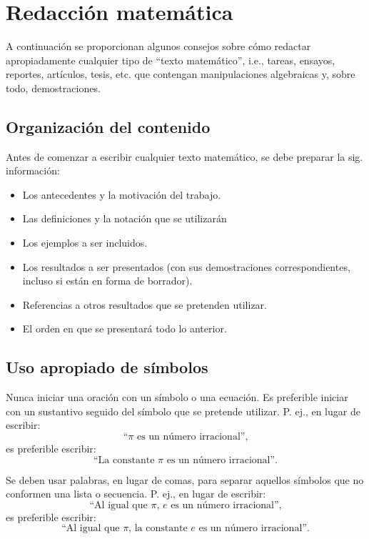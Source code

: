\chapter{Redacción matemática}

A continuación se proporcionan algunos consejos sobre cómo redactar apropiadamente cualquier tipo de ``texto matemático'', i.e., tareas, ensayos, reportes, artículos, tesis, etc. que contengan manipulaciones algebraicas y, sobre todo, demostraciones.


\section{Organización del contenido}

Antes de comenzar a escribir cualquier texto matemático, se debe preparar la sig. información:

\begin{itemize}
  \item Los antecedentes y la motivación del trabajo.
  \item Las definiciones y la notación que se utilizarán
  \item Los ejemplos a ser incluidos.
  \item Los resultados a ser presentados (con sus demostraciones correspondientes, incluso si están en forma de borrador).
  \item Referencias a otros resultados que se pretenden utilizar.
  \item El orden en que se presentará todo lo anterior.
\end{itemize}


\section{Uso apropiado de símbolos}

Nunca iniciar una oración con un símbolo o una ecuación. 
Es preferible iniciar con un sustantivo seguido del símbolo que se pretende utilizar.
P. ej., en lugar de escribir:
\[
  \text{``}\pi\text{ es un número irracional'',}
\]
es preferible escribir:
\[
  \text{``La constante }\pi\text{ es un número irracional''.}
\]

Se deben usar palabras, en lugar de comas, para separar aquellos símbolos que no conformen una lista o secuencia.
P. ej., en lugar de escribir:
\[
  \text{``Al igual que }\pi\text{, }e\text{ es un número irracional'',}
\]
es preferible escribir:
\[
  \text{``Al igual que }\pi\text{, la constante }e\text{ es un número irracional''.}
\]

